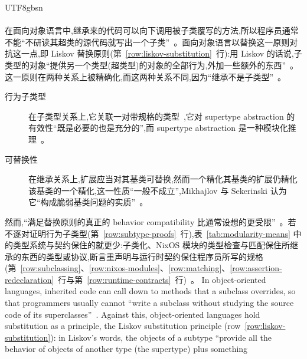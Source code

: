 \begin{CJK*}{UTF8}{gbsn}
\paragraph{}
\ifPaperChinese
在面向对象语言中,继承来的代码可以向下调用被子类覆写的方法,所以程序员通常不能``不研读其超类的源代码就写出一个子类''~\cite[第~208~页]{ruby2000-safely-creating-subclasses}。面向对象语言以替换这一原则对抗这一点,即 Liskov 替换原则(第~\ref{row:liskov-substitution}~行):用 Liskov 的话说,子类型的对象``提供另一个类型(超类型)的对象的全部行为,外加一些额外的东西''~\cite{liskov1987-data-abstraction-hierarchy}。这一原则在两种关系上被精确化,而这两种关系不同,因为``继承不是子类型''~\cite{cook1990-inheritance-not-subtyping}。
\begin{description}
  \item[行为子类型] 在子类型关系上,它关联一对带规格的类型~\cite{liskov1994-behavioral-subtyping},它对 supertype abstraction 的有效性``既是必要的也是充分的'',而 supertype abstraction 是一种模块化推理~\cite{leavens2015-behavioral-subtyping-modular-reasoning}。
  \item[可替换性] 在继承关系上,扩展应当对其基类可替换,然而一个精化其基类的扩展仍精化该基类的一个精化,这一性质``一般不成立'',Mikhajlov 与 Sekerinski 认为它``构成脆弱基类问题的实质''~\cite{mikhajlov1998-fragile-base-class}。
\end{description}
然而,``满足替换原则的真正的 behavior compatibility 比通常设想的更受限''~\cite[\S~4]{wegner1988-inheritance-incremental-modification}。若不逐对证明行为子类型(第~\ref{row:subtype-proofs}~行),表~\ref{tab:modularity-means} 中的类型系统与契约保住的就更少:子类化、NixOS 模块的类型检查与匹配保住所继承的东西的类型或协议,断言重声明与运行时契约保住程序员所写的规格(第~\ref{row:subclassing}、\ref{row:nixos-modules}、\ref{row:matching}、\ref{row:assertion-redeclaration}~行与第~\ref{row:runtime-contracts}~行)~\cite{gosling2015-java-se8-specification, nixos-contributors-nixos-modules, abadi1996-subtyping-and-matching, meyer1997-object-oriented-software-construction, findler2001-behavioral-contracts}。
\else
In object-oriented languages, inherited code can call down to methods that a subclass overrides, so
that programmers usually cannot ``write a subclass without studying the source code of its
superclasses''~\cite[p.~208]{ruby2000-safely-creating-subclasses}.
Against this, object-oriented languages hold substitution as a principle, the Liskov substitution
principle (row~\ref{row:liskov-substitution}): in Liskov's words, the objects of a subtype ``provide all
the behavior of objects of another type (the supertype) plus something

\end{CJK*}
